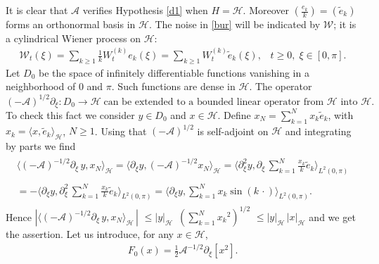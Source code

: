 \documentclass[preprint]{imsart}
\def\A{\mathcal A}
\def\H{\mathcal  H}
\def\W{\mathcal  W}
\begin{document}
It is clear that $\A$ verifies Hypothesis  \ref{d1} when  $H = \H$. Moreover
 $(\frac{e_k}{k}) = (\tilde e_k)$ forms  an orthonormal basis in $\H$. 
 The noise in \eqref{bur} will be indicated by $\W$; it  is a 
   cylindrical Wiener process on $\H$:
   \begin{equation}\label{noise}
   \begin{array}{l} 
\W_t(\xi) = \sum_{k \ge 1 }  \frac{1}{k}
   W_t^{(k)}  {e_k(\xi)} = \sum_{k \ge 1 }   
   W_t^{(k)}  {\tilde e_k(\xi)},\;\;\; t \ge 0,\; \xi \in [0,\pi]. 
\end{array} 
\end{equation} 
Let $D_0$ be the space of infinitely differentiable functions vanishing in a 
neighborhood of $0$ and $\pi$. Such functions are dense in $\H$. The operator
\begin{equation}\label{s33}
(-\A )^{1/2} \partial_{\xi} : D_0 \to \H \; \text{can be extended to a bounded linear operator from $\H$ into $\H$}. 
\end{equation}
To check this fact we consider $y \in D_0$ and $x \in \H$. Define $x_N = \sum_{k = 1 }^N   
   x_k  {\tilde e_k}$, with $x_k = \langle x, \tilde e_k \rangle_{\H}$, $N\ge 1$.
  Using that $(- \A )^{1/2}$ is self-adjoint on $\H$ and integrating by parts we find 
\begin{gather*} 
\begin{array}{l}
 \langle (-\A )^{-1/2}  \partial_{\xi} \, y , x_N \rangle_{\H} = \langle   \partial_{\xi} y , (- \A)^{-1/2} x_N \rangle_{\H} =  
  \langle \partial_{\xi}^2    y , \partial_{\xi} \, \sum_{k = 1 }^N   
   \frac{x_k}{k}  {\tilde e_k} \rangle_{L^2(0,\pi)}    
  \\ \\
=   - \langle \partial_{\xi}    y , \partial_{\xi}^2 \, \sum_{k = 1 }^N   
   \frac{x_k}{k}  {\tilde e_k} \rangle_{L^2(0,\pi)}
    =
     \langle \partial_{\xi}     y ,   \sum_{k = 1 }^N   
    {x_k} { \sin (k \, \cdot)}  \rangle_{L^2(0,\pi)}. 
    \end{array}
  \end{gather*}   
  Hence $|\langle (-\A )^{-1/2}  \partial_{\xi} \, y , x_N \rangle_{\H}\, |$
  $\le |y|_{\H} \, $ $ (\sum_{k = 1 }^N   
    {x_k}^2)^{1/2}$ $\le |y|_{\H} \,|x|_{\H} $ 
   and 
  we  get the assertion. 
   Let us introduce, for any $x \in \H$,  
   \begin{equation} \label{f02}
   \begin{array}{l}
   F_0 (x) =  \frac{1}{2}  {\A}^{-1/2} \partial_{\xi} [x^2].
   \end{array}
   \end{equation}
\end{document}
